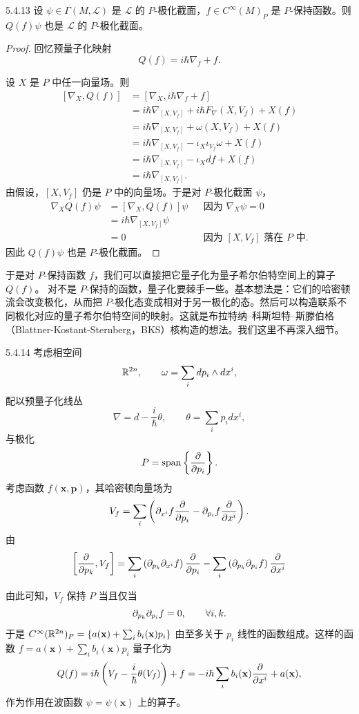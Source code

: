 \begin{proposition}{5.4.13}
  设 $\psi\in\Gamma(M,\mathcal{L})$ 是 $\mathcal{L}$ 的 $P$-极化截面，$f\in C^\infty(M)_P$
  是 $P$-保持函数。则 $Q(f)\psi$ 也是 $\mathcal{L}$ 的 $P$-极化截面。
\end{proposition}

\begin{proof}
  回忆预量子化映射
  \[
  Q(f)=i\hbar\nabla_f+f.
  \]

  设 $X$ 是 $P$ 中任一向量场。则
  \[
  \begin{aligned}
  [\nabla_X,Q(f)]
  &=[\nabla_X,i\hbar\nabla_f+f]\\
  &=i\hbar\nabla_{[X,V_f]}+i\hbar F_\nabla(X,V_f)+X(f)\\
  &=i\hbar\nabla_{[X,V_f]}+\omega(X,V_f)+X(f)\\
  &=i\hbar\nabla_{[X,V_f]}-\iota_X\iota_{V_f}\omega+X(f)\\
  &=i\hbar\nabla_{[X,V_f]}-\iota_Xdf+X(f)\\
  &=i\hbar\nabla_{[X,V_f]}.
  \end{aligned}
  \]
  由假设，$[X,V_f]$ 仍是 $P$ 中的向量场。于是对 $P$-极化截面 $\psi$，
  \[
  \begin{aligned}
  \nabla_XQ(f)\psi
  &=[\nabla_X,Q(f)]\psi
  &&\text{因为 } \nabla_X\psi=0\\
  &=i\hbar\nabla_{[X,V_f]}\psi\\
  &=0
  &&\text{因为 } [X,V_f] \text{ 落在 } P \text{ 中}.
  \end{aligned}
  \]
  因此 $Q(f)\psi$ 也是 $P$-极化截面。
\end{proof}

于是对 $P$-保持函数 $f$，我们可以直接把它量子化为量子希尔伯特空间上的算子 $Q(f)$。
对不是 $P$-保持的函数，量子化要棘手一些。基本想法是：它们的哈密顿流会改变极化，从而把 $P$-极化态变成相对于另一极化的态。然后可以构造联系不同极化对应的量子希尔伯特空间的映射。这就是布拉特纳–科斯坦特–斯滕伯格（Blattner-Kostant-Sternberg，BKS）核构造的想法。我们这里不再深入细节。

\begin{example}{5.4.14}
  考虑相空间
  \[
  \mathbb{R}^{2n},\qquad \omega=\sum_idp_i\wedge dx^i,
  \]
  配以预量子化线丛
  \[
  \nabla=d-\frac{i}{\hbar}\theta,\qquad \theta=\sum_ip_idx^i,
  \]
  与极化
  \[
  P=\operatorname{span}\left\{\frac{\partial}{\partial p_i}\right\}.
  \]
  考虑函数 $f(\mathbf x,\mathbf p)$，其哈密顿向量场为
  \[
  V_f=\sum_i\left(\partial_{x^i}f\frac{\partial}{\partial p_i}
  -\partial_{p_i}f\frac{\partial}{\partial x^i}\right).
  \]
  由
  \[
  \left[\frac{\partial}{\partial p_k},V_f\right]
  =\sum_i\left(\partial_{p_k}\partial_{x^i}f\right)\frac{\partial}{\partial p_i}
  -\sum_i\left(\partial_{p_k}\partial_{p_i}f\right)\frac{\partial}{\partial x^i}
  \]

  由此可知，$V_f$ 保持 $P$ 当且仅当
  \[
  \partial_{p_k}\partial_{p_i}f=0,\qquad\forall i,k.
  \]
  于是 $C^\infty(\mathbb{R}^{2n})_P=\left\{a(\mathbf x)+\sum_ib_i(\mathbf x)p_i\right\}$
  由至多关于 $p_i$ 线性的函数组成。这样的函数
  $f=a(\mathbf x)+\sum_ib_i(\mathbf x)p_i$ 量子化为
  \[
  Q(f)=i\hbar\left(V_f-\frac{i}{\hbar}\theta(V_f)\right)+f
  =-i\hbar\sum_ib_i(\mathbf x)\frac{\partial}{\partial x^i}+a(\mathbf x),
  \]
  作为作用在波函数 $\psi=\psi(\mathbf x)$ 上的算子。
\end{example}

